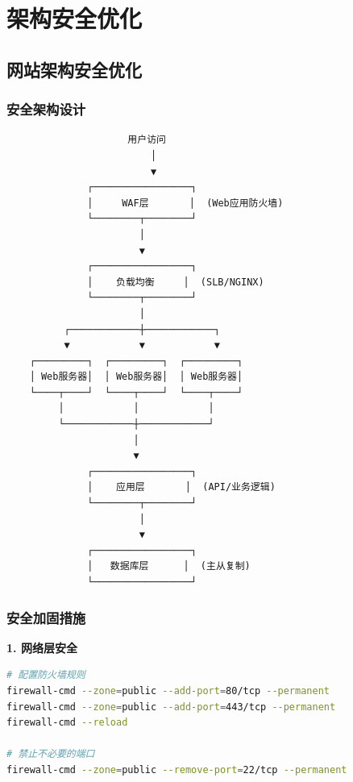 \documentclass[12pt,UTF8]{ctexbook}
\begin{document}
\chapter{架构安全优化}
\label{chap:security-optimization}

\section{网站架构安全优化}
\label{sec:arch-security}

\subsection*{安全架构设计}

\begin{lstlisting}
                     用户访问
                         │
                         ▼
              ┌─────────────────┐
              │     WAF层       │  (Web应用防火墙)
              └────────┬────────┘
                       │
                       ▼
              ┌─────────────────┐
              │    负载均衡     │  (SLB/NGINX)
              └────────┬────────┘
                       │
          ┌────────────┼────────────┐
          ▼            ▼            ▼
    ┌─────────┐  ┌─────────┐  ┌─────────┐
    │ Web服务器│  │ Web服务器│  │ Web服务器│
    └────┬────┘  └────┬────┘  └────┬────┘
         │            │            │
         └────────────┼────────────┘
                      │
                      ▼
              ┌─────────────────┐
              │    应用层       │  (API/业务逻辑)
              └────────┬────────┘
                       │
                       ▼
              ┌─────────────────┐
              │   数据库层      │  (主从复制)
              └─────────────────┘
\end{lstlisting}

\subsection*{安全加固措施}

\textbf{1. 网络层安全}
\begin{lstlisting}[language=bash]
# 配置防火墙规则
firewall-cmd --zone=public --add-port=80/tcp --permanent
firewall-cmd --zone=public --add-port=443/tcp --permanent
firewall-cmd --reload

# 禁止不必要的端口
firewall-cmd --zone=public --remove-port=22/tcp --permanent
\end{lstlisting}
\end{document}
